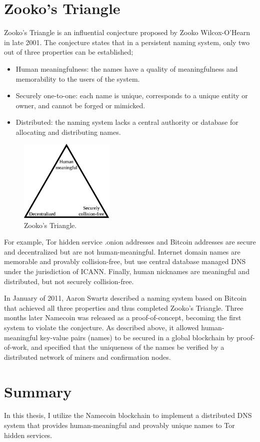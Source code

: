 \section{Zooko's Triangle}

Zooko's Triangle is an influential conjecture proposed by Zooko Wilcox-O'Hearn in late 2001. %
The conjecture states that in a persistent naming system, only two out of three properties can be established; 

\begin{itemize}
  \item Human meaningfulness: the names have a quality of meaningfulness and memorability to the users of the system. 
  \item Securely one-to-one: each name is unique, corresponds to a unique entity or owner, and cannot be forged or mimicked.
  \item Distributed: the naming system lacks a central authority or database for allocating and distributing names.
\end{itemize}

\begin{figure}[htbp]
	\centering
	\includegraphics[width=0.4\textwidth]{images/Zooko.eps}
	\caption{Zooko's Triangle.}
	\label{fig:figure8}
\end{figure}

For example, Tor hidden service .onion addresses and Bitcoin addresses are secure and decentralized but are not human-meaningful. Internet domain names are memorable and provably collision-free, but use central database managed DNS under the jurisdiction of ICANN. Finally, human nicknames are meaningful and distributed, but not securely collision-free. %

In January of 2011, Aaron Swartz described a naming system based on Bitcoin that achieved all three properties and thus completed Zooko's Triangle. Three months later Namecoin was released as a proof-of-concept, becoming the first system to violate the conjecture. As described above, it allowed human-meaningful key-value pairs (names) to be secured in a global blockchain by proof-of-work, and specified that the uniqueness of the names be verified by a distributed network of miners and confirmation nodes.





\section{Summary}

In this thesis, I utilize the Namecoin blockchain to implement a distributed DNS system that provides human-meaningful and provably unique names to Tor hidden services.


